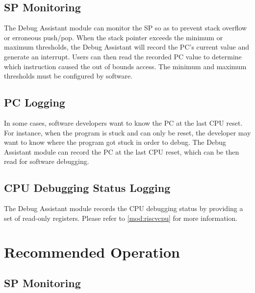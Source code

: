 \documentclass[main\_\_EN.tex]{subfiles}
\begin{document}

\subsection{SP Monitoring}

The Debug Assistant module can monitor the SP so as to prevent stack overflow or erroneous push/pop. When the stack pointer exceeds the minimum or maximum thresholds, the Debug Assistant will record the PC's current value and generate an interrupt. Users can then read the recorded PC value to determine which instruction caused the out of bounds access. The minimum and maximum thresholds must be configured by software.



\subsection{PC Logging}

In some cases, software developers want to know the PC at the last CPU reset. For instance, when the program is stuck and can only be reset, the developer may want to know where the program got stuck in order to debug. The Debug Assistant module can record the PC at the last CPU reset, which can be then read for software debugging. 


\subsection{CPU Debugging Status Logging}
The Debug Assistant module records the CPU debugging status by providing a set of read-only registers. Please refer to \ref{mod:riscvcpu} \textit{} for more information.


\section{Recommended Operation}\label{sec:dbgassist-recommended-operation}



\subsection{SP Monitoring}
\end{document}
